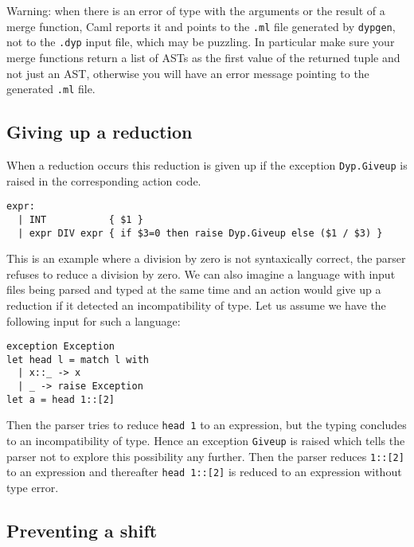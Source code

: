 \documentclass[12pt]{article}
\begin{document}
{Warning: when there is an error of type with the arguments or the result of a merge function, Caml reports it and points to the \texttt{.ml} file generated by \texttt{dypgen}, not to the \texttt{.dyp} input file, which may be puzzling. In particular make sure your merge functions return a list of ASTs as the first value of the returned tuple and not just an AST, otherwise you will have an error message pointing to the generated \verb|.ml| file.

\subsection{Giving up a reduction}

When a reduction occurs this reduction is given up if the exception \texttt{Dyp.Giveup} is raised in the corresponding action code.
\begin{verbatim}
expr:
  | INT           { $1 }
  | expr DIV expr { if $3=0 then raise Dyp.Giveup else ($1 / $3) }
\end{verbatim}
This is an example where a division by zero is not syntaxically correct, the parser refuses to reduce a division by zero. We can also imagine a language with input files being parsed and typed at the same time and an action would give up a reduction if it detected an incompatibility of type. Let us assume we have the following input for such a language:
\begin{verbatim}
exception Exception
let head l = match l with
  | x::_ -> x
  | _ -> raise Exception
let a = head 1::[2]
\end{verbatim}
Then the parser tries to reduce \texttt{head 1} to an expression, but the typing concludes to an incompatibility of type. Hence an exception \texttt{Giveup} is raised which tells the parser not to explore this possibility any further. Then the parser reduces \texttt{1::[2]} to an expression and thereafter \texttt{head 1::[2]} is reduced to an expression without type error.

\subsection{Preventing a shift}\label{will_shift}

}
\end{document}
